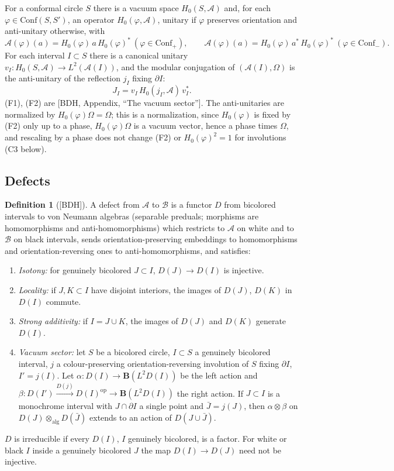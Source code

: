 \documentclass[11pt]{article}
\theoremstyle{definition}
\newtheorem{definition}[theorem]{Definition}
\theoremstyle{remark}
\newcommand{\cA}{\mathcal A}
\newcommand{\cB}{\mathcal B}
\newcommand{\Om}{\Omega}
\newcommand{\bfB}{\mathbf B}
\begin{document}
For a conformal circle $S$ there is a vacuum space $H_0(S,\cA)$ and, for each $\varphi\in\mathrm{Conf}(S,S')$, an operator $H_0(\varphi,\cA)$, unitary if $\varphi$ preserves orientation and anti-unitary otherwise, with
\[
\cA(\varphi)(a)=H_0(\varphi)\,a\,H_0(\varphi)^*\ (\varphi\in\mathrm{Conf}_+),\qquad \cA(\varphi)(a)=H_0(\varphi)\,a^*\,H_0(\varphi)^*\ (\varphi\in\mathrm{Conf}_-).\tag{F2}
\]
For each interval $I\subset S$ there is a canonical unitary $v_I\colon H_0(S,\cA)\to L^2(\cA(I))$, and the modular conjugation of $(\cA(I),\Om)$ is the anti-unitary of the reflection $j_I$ fixing $\partial I$:
\[
J_I=v_I\,H_0(j_I,\cA)\,v_I^*.\tag{F1}
\]
(F1), (F2) are [BDH, Appendix, ``The vacuum sector'']. The anti-unitaries are normalized by $H_0(\varphi)\Om=\Om$; this is a normalization, since $H_0(\varphi)$ is fixed by (F2) only up to a phase, $H_0(\varphi)\Om$ is a vacuum vector, hence a phase times $\Om$, and rescaling by a phase does not change (F2) or $H_0(\varphi)^2=1$ for involutions (C3 below).

\subsection{Defects}\label{sec:defects}
\begin{definition}[{[BDH]}]\label{def:defect}
A defect from $\cA$ to $\cB$ is a functor $D$ from bicolored intervals to von Neumann algebras (separable preduals; morphisms are homomorphisms and anti-homomorphisms) which restricts to $\cA$ on white and to $\cB$ on black intervals, sends orientation-preserving embeddings to homomorphisms and orientation-reversing ones to anti-homomorphisms, and satisfies:
\begin{enumerate}[label=(\arabic*),nosep]
\item \emph{Isotony:} for genuinely bicolored $J\subset I$, $D(J)\to D(I)$ is injective.
\item \emph{Locality:} if $J,K\subset I$ have disjoint interiors, the images of $D(J)$, $D(K)$ in $D(I)$ commute.
\item \emph{Strong additivity:} if $I=J\cup K$, the images of $D(J)$ and $D(K)$ generate $D(I)$.
\item \emph{Vacuum sector:} let $S$ be a bicolored circle, $I\subset S$ a genuinely bicolored interval, $j$ a colour-preserving orientation-reversing involution of $S$ fixing $\partial I$, $I'=j(I)$. Let $\alpha\colon D(I)\to\bfB(L^2D(I))$ be the left action and $\beta\colon D(I')\xrightarrow{D(j)}D(I)^{\mathrm{op}}\to\bfB(L^2D(I))$ the right action. If $J\subset I$ is a monochrome interval with $J\cap\partial I$ a single point and $\bar J=j(J)$, then $\alpha\otimes\beta$ on $D(J)\otimes_{\mathrm{alg}}D(\bar J)$ extends to an action of $D(J\cup\bar J)$.
\end{enumerate}
$D$ is irreducible if every $D(I)$, $I$ genuinely bicolored, is a factor. For white or black $I$ inside a genuinely bicolored $J$ the map $D(I)\to D(J)$ need not be injective.
\end{definition}
\end{document}
